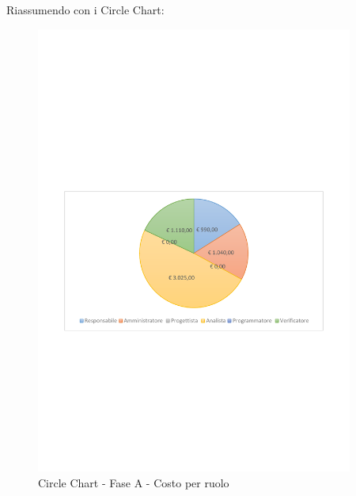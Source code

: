 \documentclass[../PianoProgetto.tex]{subfiles}
\begin{document}
\vfill	
Riassumendo con i Circle Chart:

	\begin{figure}[!h]
		\centering
		\includegraphics[width=0.93\textwidth , trim=2cm 9.5cm 2cm 11cm]{grafici/A/A-costo}
			\caption{Circle Chart - Fase A - Costo per ruolo}
		\label{fig:CircleChart-faseA_costo}
	\end{figure}
\vfill	
\newpage
\vfill	
\end{document}
